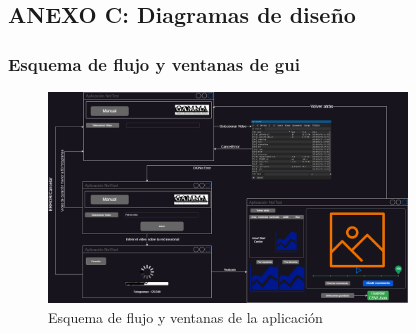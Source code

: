 \subsection*{ANEXO C: Diagramas de diseño}
\subsubsection*{Esquema de flujo y ventanas de \acrshort{gui}}
\label{esquema:FlujoVentanas}
\begin{figure}[H]
    \centering
    \includegraphics[angle=90,origin=c,width=0.85\textwidth]{images/13/c/Interfaz.png}
    \caption{Esquema de flujo y ventanas de la aplicación}
    \label{fig:FlujoVentanas}
\end{figure}